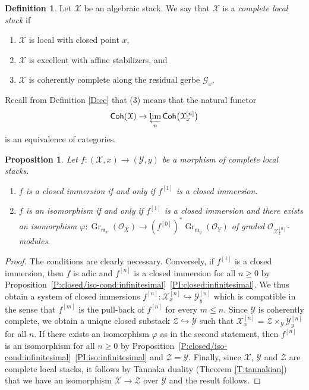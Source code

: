 \documentclass[a4paper]{amsart}
\theoremstyle{plain}
\newtheorem{proposition}[theorem]{Proposition}
\theoremstyle{definition}
\newtheorem{definition}[theorem]{Definition}
\theoremstyle{remark}
\numberwithin{equation}{section}
\newcommand{\inj}{\hookrightarrow} %
\newcommand{\stX}{\mathcal{X}} %
\newcommand{\stY}{\mathcal{Y}} %
\newcommand{\stZ}{\mathcal{Z}} %
\newcommand{\idm}{\mathfrak{m}} %
\DeclareMathOperator{\Gr}{Gr} %
\newcommand\cG{\mathcal{G}}
\newcommand\cX{\mathcal{X}}
\newcommand\oh{\mathcal{O}}
\newcommand\Coh{\mathsf{Coh}}
\newcommand{\ilim}{\varprojlim}
\newcommand{\itemref}[1]{\eqref{#1}}
\begin{document}

\begin{definition}\label{D:complete-local-stack}
Let $\stX$ be an algebraic stack. We say that $\stX$ is a
\emph{complete local stack} if
\begin{enumerate}
\item $\stX$ is local with closed point $x$,
\item $\stX$ is excellent with affine stabilizers, and
\item $\stX$ is coherently complete along the residual gerbe $\cG_x$.
\end{enumerate}
Recall
from Definition \ref{D:cc} that (3) means that the natural functor
\[
  \Coh(\cX)  \to  \ilim_n \Coh\bigl(\cX_x^{[n]}\bigr)
\]
is an equivalence of categories.
\end{definition}

\begin{proposition}\label{P:closed/iso-cond:complete}
Let $f\colon (\stX,x)\to (\stY,y)$ be a morphism of complete local stacks.
\begin{enumerate}
\item\label{PI:closed:complete}
  $f$ is a closed immersion if and only if $f^{[1]}$ is a closed immersion.
\item\label{PI:iso:complete}
  $f$ is an isomorphism if and only if $f^{[1]}$ is a closed immersion and there
  exists an isomorphism $\varphi\colon \Gr_{\idm_x}(\oh_X)\to
  (f^{[0]})^*\Gr_{\idm_y}(\oh_Y)$ of graded $\oh_{\stX_x^{[0]}}$-modules.
\end{enumerate}
\end{proposition}
\begin{proof}
The conditions are clearly necessary. Conversely, if $f^{[1]}$ is a closed
immersion, then $f$ is adic and $f^{[n]}$ is a closed immersion for all $n\geq
0$ by
Proposition~\ref{P:closed/iso-cond:infinitesimal}~\itemref{PI:closed:infinitesimal}. We thus obtain a system of closed immersions $f^{[n]}\colon \stX_x^{[n]}\inj
\stY_y^{[n]}$ which is compatible in the sense that $f^{[m]}$ is the pull-back of $f^{[n]}$ for every $m\leq n$. Since $\stY$ is coherently complete, we obtain a unique closed
substack $\stZ\inj \stY$ such that $\stX_x^{[n]}=\stZ\times_\stY \stY_y^{[n]}$ for all $n$.
If there exists an isomorphism
$\varphi$ as in the second statement, then $f^{[n]}$ is an isomorphism for all
$n\geq 0$ by Proposition~\ref{P:closed/iso-cond:infinitesimal}~\itemref{PI:iso:infinitesimal} and $\stZ=\stY$.
Finally, since
$\stX$, $\stY$ and $\stZ$ are complete local stacks, it follows by Tannaka duality (Theorem \ref{T:tannakian})
that we have an isomorphism $\stX\to \stZ$ over $\stY$ and the result follows.
\end{proof}
\end{document}
